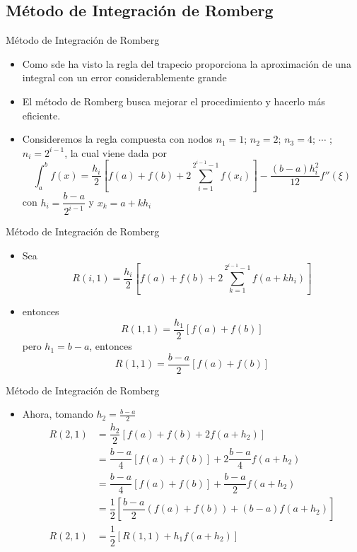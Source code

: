 \documentclass[12pt]{beamer}
\begin{document}
\subsection{M\'etodo de Integraci\'on de Romberg}
\begin{frame}{M\'etodo de Integraci\'on de Romberg}
  \begin{itemize}
    \item Como sde ha visto la regla del trapecio proporciona la aproximaci\'on
    de una integral con un error considerablemente grande
    \item<2-> El m\'etodo de Romberg busca mejorar el procedimiento y hacerlo m\'as eficiente.
    \item<3-> Consideremos la regla compuesta con nodos $n_1 = 1$; $n_2 = 2$; $n_3 =
    4$; $\cdots$ ; $n_i = 2^{i-1}$, la cual viene dada por
    $$
      \int_{a}^{b}f(x) = \dfrac{h_i}{2}\left[f(a)+ f(b)+2\sum_{i=1}^{2^{i-1}-1}f(x_i)\right] - \dfrac{(b-a)h_i^2}{12}f''(\xi)
    $$
    con $h_i = \dfrac{b-a}{2^{i-1}}$ y $x_k = a+kh_i$
  \end{itemize}
\end{frame}
\begin{frame}{M\'etodo de Integraci\'on de Romberg}
  \begin{itemize}
    \item Sea
    $$
    R(i,1) = \dfrac{h_i}{2}\left[f(a)+ f(b)+2\sum_{k=1}^{2^{i-1}-1}f(a+kh_i)\right]
    $$
    \item<2-> entonces
    $$
    R(1,1) = \dfrac{h_1}{2}\left[f(a)+ f(b)\right]
    $$
    pero $h_1=b-a$, entonces
    $$
    R(1,1) = \dfrac{b-a}{2}\left[f(a)+ f(b)\right]
    $$
  \end{itemize}
\end{frame}
\begin{frame}{M\'etodo de Integraci\'on de Romberg}
  \begin{itemize}
    \item Ahora, tomando $h_2=\frac{b-a}{2}$
    \begin{align*}
      R(2,1) & = \dfrac{h_2}{2}\left[f(a)+ f(b)+2f(a+h_2)\right]\\
      & = \dfrac{b-a}{4}\left[f(a)+ f(b)\right]+ 2\dfrac{b-a}{4}f(a+h_2)\\
      & = \dfrac{b-a}{4}\left[f(a)+ f(b)\right]	+ \dfrac{b-a}{2}f(a+h_2)\\
      & = \dfrac{1}{2}\left[\dfrac{b-a}{2}\left(f(a)+ f(b)\right) + (b-a)f(a+h_2)\right]\\
      R(2,1) & = \dfrac{1}{2}\left[R(1,1) + h_1f(a+h_2)\right]        
    \end{align*}
  \end{itemize}
\end{frame}
\end{document}
